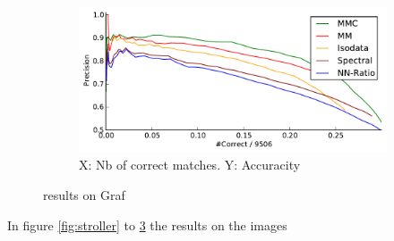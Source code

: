 \documentclass{article}
\begin{document}
\begin{figure}
{\begin{subfigure}[t]{0.35\textwidth}
			\label{fig:graf3}
		\end{subfigure}%
		~ %
		\begin{subfigure}[t]{0.35\textwidth}
			\centering
			\includegraphics[width=\textwidth]{images/result_graf}
			\caption{X: Nb of correct matches. Y: Accuracity}
			\label{fig:result_graf}
		\end{subfigure}%
	}%
	\label{fig:graf}
	\caption{results on Graf}
\end{figure}

In figure \ref{fig:stroller} to \ref{fig:graf} the results on the images



\end{document}
